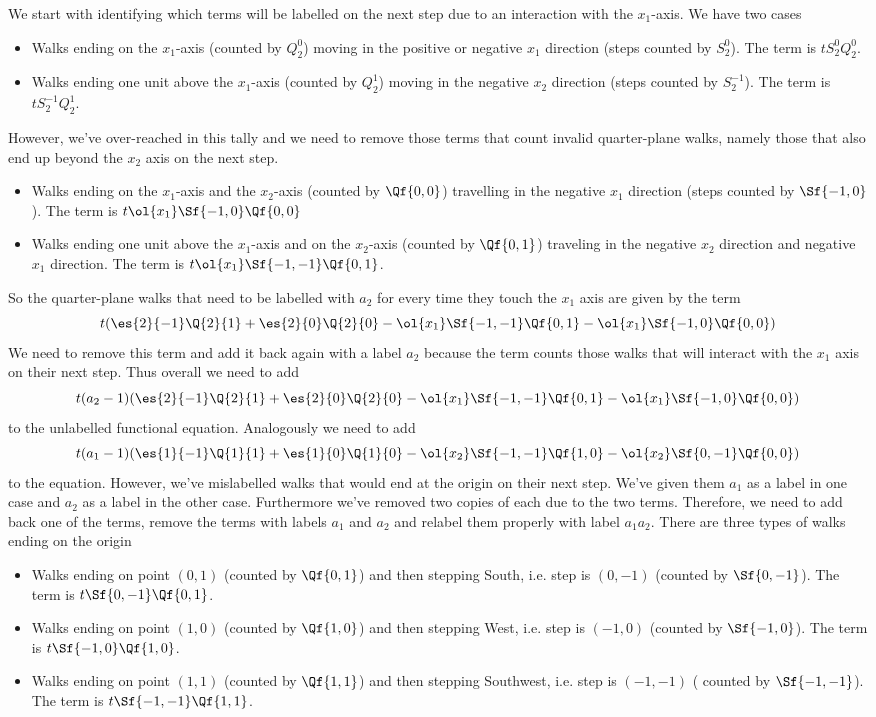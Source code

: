 We start with identifying which terms will be labelled on the next step due to an interaction with the $x_1$-axis. We have two cases
\begin{itemize}
	\item Walks ending on the $x_1$-axis (counted by $Q_2^0$) moving in the positive or negative $x_1$ direction (steps counted by $S_2^0$). The term is $tS_2^0 Q_2^0$.
	\item Walks ending one unit above the $x_1$-axis (counted by $Q_2^1$) moving in the negative $x_2$ direction (steps counted by $S_2^{-1}$). The term is $tS_2^{-1} Q_2^1$.
\end{itemize}
However, we've over-reached in this tally and we need to remove those terms that count invalid quarter-plane walks, namely those that also end up beyond the $x_2$ axis on the next step. 
\begin{itemize}
	\item Walks ending on the $x_1$-axis and the $x_2$-axis (counted by $\Qf{0,0}$) travelling in the negative $x_1$ direction (steps counted by $\Sf{-1,0}$). The term is $t\ol{x_1}\Sf{-1,0}\Qf{0,0}$
	\item Walks ending one unit above the $x_1$-axis and on the $x_2$-axis (counted by $\Qf{0,1}$) traveling in the negative $x_2$ direction and negative $x_1$ direction. The term is $t\ol{x_1}\Sf{-1,-1}\Qf{0,1}$.
\end{itemize}
So the quarter-plane walks that need to be labelled with $a_2$ for every time they touch the $x_1$ axis are given by the term
\[
	t(\es{2}{-1}\Q{2}{1}+\es{2}{0}\Q{2}{0}-\ol{x_1}\Sf{-1,-1}\Qf{0,1}-\ol{x_1}\Sf{-1,0}\Qf{0,0})
\]
We need to remove this term and add it back again with a label $a_2$ because the term counts those walks that will interact with the $x_1$ axis on their next step. Thus overall we need to add
\[
	t(a_2-1)(\es{2}{-1}\Q{2}{1}+\es{2}{0}\Q{2}{0}-\ol{x_1}\Sf{-1,-1}\Qf{0,1}-\ol{x_1}\Sf{-1,0}\Qf{0,0})
\]
to the unlabelled functional equation. Analogously we need to add
\[
	t(a_1-1)(\es{1}{-1}\Q{1}{1}+\es{1}{0}\Q{1}{0}-\ol{x_2}\Sf{-1,-1}\Qf{1,0}-\ol{x_2}\Sf{0,-1}\Qf{0,0})
\]
to the equation. However, we've mislabelled walks that would end at the origin on their next step. We've given them $a_1$ as a label in one case and $a_2$ as a label in the other case. Furthermore we've removed two copies of each due to the two terms. Therefore, we need to add back one of the terms, remove the terms with labels $a_1$ and $a_2$ and relabel them properly with label $a_1a_2$. There are three types of walks ending on the origin
\begin{itemize}
	\item Walks ending on point $(0,1)$ (counted by $\Qf{0,1}$) and then stepping South, i.e. step is $(0,-1)$ (counted by $\Sf{0,-1}$). The term is $t\Sf{0,-1}\Qf{0,1}$.
	\item Walks ending on point $(1,0)$ (counted by $\Qf{1,0}$) and then stepping West, i.e. step is $(-1,0)$ (counted by $\Sf{-1,0}$). The term is $t\Sf{-1,0}\Qf{1,0}$.
	\item Walks ending on point $(1,1)$ (counted by $\Qf{1,1}$) and then stepping Southwest, i.e. step is $(-1,-1)$ ( counted by $\Sf{-1,-1}$). The term is $t\Sf{-1,-1}\Qf{1,1}$.
\end{itemize}
